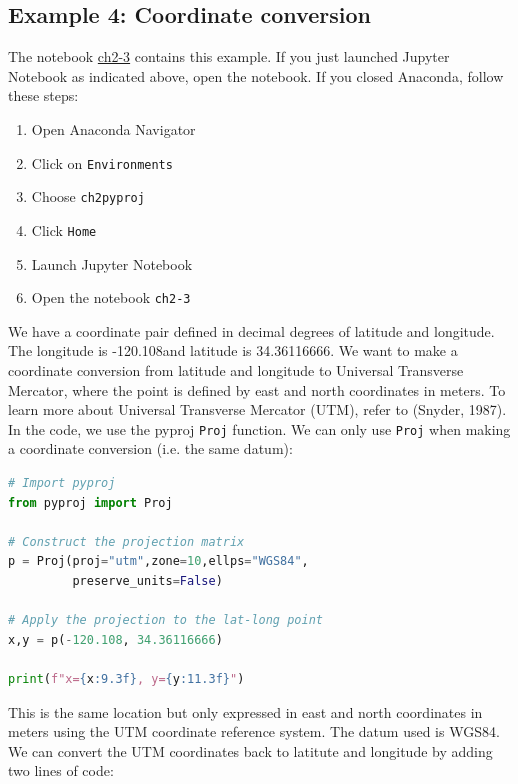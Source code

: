 \documentclass[a4paper , 12pt]{book}
\newcommand{\code}[1]{\colorbox{light-gray}{\texttt{#1}}}
\begin{document}
\subsection*{Example 4: Coordinate conversion}

The notebook \href{https://github.com/nfcd/compGeo/blob/master/source/notebooks/ch2-3.ipynb}{ch2-3} contains this example. If you just launched Jupyter Notebook as indicated above, open the notebook. If you closed Anaconda, follow these steps:

\begin{enumerate}
    \item Open Anaconda Navigator
    \item Click on \code{Environments}
    \item Choose \code{ch2pyproj}
    \item Click \code{Home}
    \item Launch Jupyter Notebook
    \item Open the notebook \code{ch2-3}
\end{enumerate}{}

We have a coordinate pair defined in decimal degrees of latitude and longitude. The longitude is -120.108\degree\space and latitude is 34.36116666\degree. We want to make a coordinate conversion from latitude and longitude to Universal Transverse Mercator, where the point is defined by east and north coordinates in meters. To learn more about Universal Transverse Mercator (UTM), refer to (Snyder, 1987). In the code, we use the pyproj \code{Proj} function. We can only use \code{Proj} when making a coordinate conversion (i.e. the same datum):

\begin{center}
\begin{lstlisting}[language=Python, frame=single]
# Import pyproj
from pyproj import Proj

# Construct the projection matrix
p = Proj(proj="utm",zone=10,ellps="WGS84", 
         preserve_units=False)

# Apply the projection to the lat-long point
x,y = p(-120.108, 34.36116666)

print(f"x={x:9.3f}, y={y:11.3f}")
\end{lstlisting}
\end{center}

This is the same location but only expressed in east and north coordinates in meters using the UTM coordinate reference system. The datum used is WGS84. We can convert the UTM coordinates back to latitute and longitude by adding two lines of code:
\end{document}

